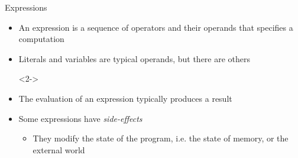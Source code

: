 \begin{frame}[fragile]{Expressions}

  \begin{itemize}
  \item An expression is a sequence of operators and their operands
    that specifies a computation
  \item Literals and variables are typical operands, but there are others

  \begin{codeblock}<2->{
}\end{codeblock}

\item<7-> The evaluation of an expression typically produces a result
\item<8-> Some expressions have \textit{side-effects}
  \begin{itemize}
  \item They modify the state of the program, i.e. the state of memory, or the
    external world
  \end{itemize}

\end{itemize}

\end{frame}

